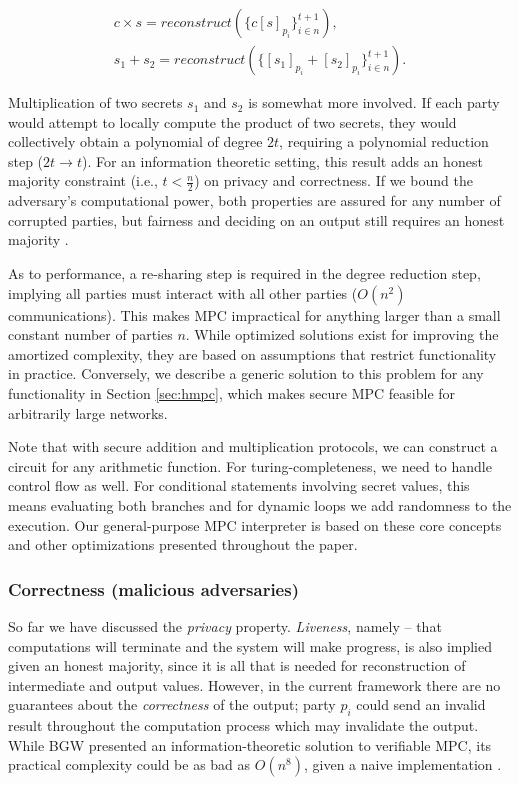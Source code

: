 \documentclass{article} \usepackage{nips13submit_e,times}
\begin{document}
\begin{eqnarray}
	c \times s = reconstruct( \{ c[s]_{p_i} \}_{i \in n}^{t+1}),\\
	s_1 + s_2 = reconstruct( \{ [s_1]_{p_i} + [s_2]_{p_i} \}_{i \in n}^{t+1}).
\end{eqnarray}

Multiplication of two secrets $s_1$ and $s_2$ is somewhat more involved. If each party would attempt to locally compute the product of two secrets, they would collectively obtain a polynomial of degree $2t$, requiring a polynomial reduction step ($2t \rightarrow t$). For an information theoretic setting, this result adds an honest majority constraint (i.e., $t < \frac{n}{2}$) on privacy and correctness. If we bound the adversary's computational power, both properties are assured for any number of corrupted parties, but fairness and deciding on an output still requires an honest majority \cite{GBW88}.

As to performance, a re-sharing step is required in the degree reduction step, implying all parties must interact with all other parties ($O(n^2)$ communications). This makes MPC impractical for anything larger than a small constant number of parties $n$. While optimized solutions exist for improving the amortized complexity, they are based on assumptions that restrict functionality in practice. Conversely, we describe a generic solution to this problem for any functionality in Section \ref{sec:hmpc}, which makes secure MPC feasible for arbitrarily large networks.

Note that with secure addition and multiplication protocols, we can construct a circuit for any arithmetic function. For turing-completeness, we need to handle control flow as well. For conditional statements involving secret values, this means evaluating both branches and for dynamic loops we add randomness to the execution. Our general-purpose MPC interpreter is based on these core concepts and other optimizations presented throughout the paper.



\subsubsection{Correctness (malicious adversaries)}
\label{sec:comp_correct}

So far we have discussed the \textit{privacy} property. \textit{Liveness}, namely -- that computations will terminate and the system will make progress, is also implied given an honest majority, since it is all that is needed for reconstruction of intermediate and output values. However, in the current framework there are no guarantees about the \textit{correctness} of the output; party $p_i$ could send an invalid result throughout the computation process which may invalidate the output. While BGW \cite{GBW88} presented an information-theoretic solution to verifiable MPC, its practical complexity could be as bad as $O(n^8)$, given a naive implementation \cite{TODO}.
\end{document}
